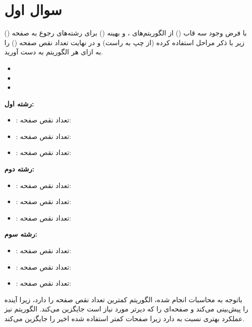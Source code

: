 \section{سوال اول}



با فرض وجود سه قاب () از الگوریتم‌های ،  و بهینه () برای رشته‌های رجوع به صفحه () زیر با ذکر مراحل استفاده کرده (از چپ به راست) و در نهایت تعداد نقص صفحه () را به ازای هر الگوریتم به دست آورید.

\begin{latin}
	\begin{itemize}
		\item {}
		\item {}
		\item {}
	\end{itemize}
	
\end{latin}


\begin{qsolve}
	
	\textbf{رشته اول:} 
	\begin{itemize}
		\item {}: تعداد نقص صفحه: 
		\item {}: تعداد نقص صفحه: 
		\item {}: تعداد نقص صفحه: 
	\end{itemize}
	
	\textbf{رشته دوم:} 
	\begin{itemize}
		\item {}: تعداد نقص صفحه: 
		\item {}: تعداد نقص صفحه: 
		\item {}: تعداد نقص صفحه: 
	\end{itemize}
	
	\textbf{رشته سوم:} 
	\begin{itemize}
		\item {}: تعداد نقص صفحه: 
		\item {}: تعداد نقص صفحه: 
		\item {}: تعداد نقص صفحه: 
	\end{itemize}
	
	 باتوجه به محاسبات انجام شده، الگوریتم  کمترین تعداد نقص صفحه را دارد، زیرا آینده را پیش‌بینی می‌کند و صفحه‌ای را که دیرتر مورد نیاز است جایگزین می‌کند. الگوریتم  نیز عملکرد بهتری نسبت به  دارد زیرا صفحات کمتر استفاده شده اخیر را جایگزین می‌کند.
	
\end{qsolve}




